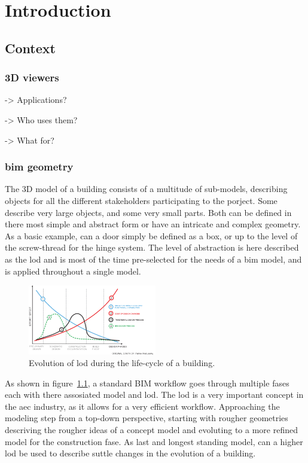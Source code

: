 \chapter{Introduction}
\section{Context}
\subsection{3D viewers}
-> Applications?

-> Who uses them?

-> What for?

\subsection{\acs{bim} geometry} \label{subsec:bimGeometry}

The 3D model of a building consists of a multitude of sub-models, describing objects for all the different stakeholders participating to the porject. Some describe very large objects, and some very small parts. Both can be defined in there most simple and abstract form or have an intricate and complex geometry. As a basic example, can a door simply be defined as a box, or up to the level of the screw-thread for the hinge system. The level of abstraction is here described as the \ac{lod} and is most of the time pre-selected for the needs of a \ac{bim} model, and is applied throughout a single model.

\begin{figure}
    \centering
    \includegraphics[width=0.5\textwidth]{figures/BIM grafiek.png}
    \caption{Evolution of \ac{lod} during the life-cycle of a building.}
    \label{fig:bimGraph}
\end{figure}

As shown in figure~\ref{fig:bimGraph}, a standard BIM workflow goes through multiple fases each with there assosiated model and \ac{lod}. The \ac{lod} is a very important concept in the \ac{aec} industry, as it allows for a very efficient workflow. Approaching the modeling step from a top-down perspective, starting with rougher geometries descriving the rougher ideas of a concept model and evoluting to a more refined model for the construction fase. As last and longest standing model, can a higher \ac{lod} be used to describe suttle changes in the evolution of a building.

